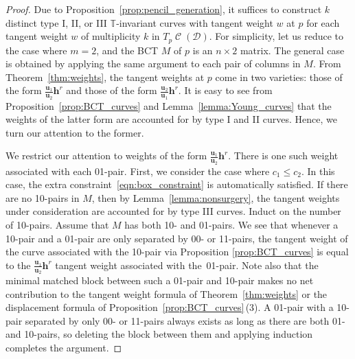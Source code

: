 \documentclass[pdftex]{sigma}
\numberwithin{equation}{section}
\newcommand{\brane}{\mathcal D}
\newcommand{\torus}{\mathbb T}
\newcommand{\hb}{\mathbf h}
\newcommand{\ub}{\mathbf u}
\DeclareMathOperator{\bowvar}{\mathcal C}
\begin{document}
\begin{proof}
Due to Proposition~\ref{prop:pencil_generation}, it suffices to construct $k$ distinct type I, II, or III $\torus$-invariant curves with tangent weight $w$ at $p$ for each tangent weight $w$ of multiplicity $k$ in $T_p\bowvar(\brane)$. For simplicity, let us reduce to the case where $m=2$, and the BCT $M$ of $p$ is an $n\times 2$ matrix. The general case is obtained by applying the same argument to each pair of columns in $M$.
From Theorem~\ref{thm:weights}, the tangent weights at $p$ come in two varieties: those of the form $\frac{\ub_1}{\ub_2}\hb^r$ and those of the form $\frac{\ub_2}{\ub_1}\hb^r$. It is easy to see from Proposition~\ref{prop:BCT_curves} and Lemma~\ref{lemma:Young_curves} that the weights of the latter form are accounted for by type I and II curves. Hence, we turn our attention to the former.

We restrict our attention to weights of the form $\frac{\ub_1}{\ub_2}\hb^r$. There is one such weight associated with each 01-pair. First, we consider the case where $c_1 \leq c_2$. In this case, the extra constraint~\eqref{eqn:box_constraint} is automatically satisfied. If there are no 10-pairs in $M$, then by Lemma~\ref{lemma:nonsurgery}, the tangent weights under consideration are accounted for by type III curves. Induct on the number of 10-pairs. Assume that $M$ has both 10- and 01-pairs. We see that whenever a 10-pair and a 01-pair are only separated by 00- or 11-pairs, the tangent weight of the curve associated with the 10-pair via Proposition \ref{prop:BCT_curves} is equal to the $\frac{\ub_1}{\ub_2}\hb^r$ tangent weight associated with the~01-pair. Note also that the minimal matched block between such a 01-pair and 10-pair makes no net contribution to the tangent weight formula of Theorem~\ref{thm:weights} or the displacement formula of Proposition~\ref{prop:BCT_curves}\,(3). A 01-pair with a 10-pair separated by only 00- or 11-pairs always exists as long as there are both 01- and 10-pairs, so deleting the block between them and applying induction completes the argument.


\end{proof}
\end{document}
